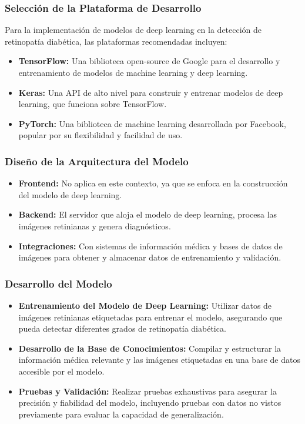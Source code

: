 \subsubsection{Selección de la Plataforma de Desarrollo}

Para la implementación de modelos de deep learning en la detección de retinopatía diabética, las plataformas recomendadas incluyen:

\begin{itemize}
    \item \textbf{TensorFlow:} Una biblioteca open-source de Google para el desarrollo y entrenamiento de modelos de machine learning y deep learning.
    \item \textbf{Keras:} Una API de alto nivel para construir y entrenar modelos de deep learning, que funciona sobre TensorFlow.
    \item \textbf{PyTorch:} Una biblioteca de machine learning desarrollada por Facebook, popular por su flexibilidad y facilidad de uso.
\end{itemize}

\subsubsection{Diseño de la Arquitectura del Modelo}

\begin{itemize}
    \item \textbf{Frontend:} No aplica en este contexto, ya que se enfoca en la construcción del modelo de deep learning.
    \item \textbf{Backend:} El servidor que aloja el modelo de deep learning, procesa las imágenes retinianas y genera diagnósticos.
    \item \textbf{Integraciones:} Con sistemas de información médica y bases de datos de imágenes para obtener y almacenar datos de entrenamiento y validación.
\end{itemize}

\subsubsection{Desarrollo del Modelo}

\begin{itemize}
    \item \textbf{Entrenamiento del Modelo de Deep Learning:} Utilizar datos de imágenes retinianas etiquetadas para entrenar el modelo, asegurando que pueda detectar diferentes grados de retinopatía diabética.
    \item \textbf{Desarrollo de la Base de Conocimientos:} Compilar y estructurar la información médica relevante y las imágenes etiquetadas en una base de datos accesible por el modelo.
    \item \textbf{Pruebas y Validación:} Realizar pruebas exhaustivas para asegurar la precisión y fiabilidad del modelo, incluyendo pruebas con datos no vistos previamente para evaluar la capacidad de generalización.
\end{itemize}
